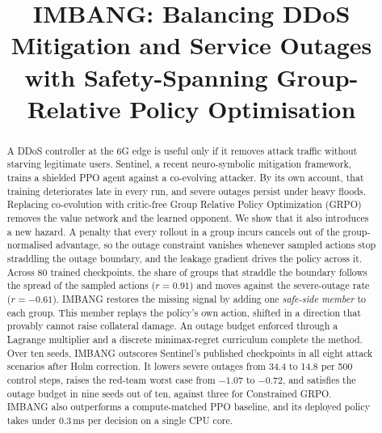 \documentclass[conference]{IEEEtran}
\begin{document}
\title{IMBANG: Balancing DDoS Mitigation and Service Outages with Safety-Spanning Group-Relative Policy Optimisation}

\author{
}

\maketitle

\begin{abstract}
A DDoS controller at the 6G edge is useful only if it removes attack traffic without starving legitimate users. Sentinel, a recent neuro-symbolic mitigation framework, trains a shielded PPO agent against a co-evolving attacker. By its own account, that training deteriorates late in every run, and severe outages persist under heavy floods. Replacing co-evolution with critic-free Group Relative Policy Optimization (GRPO) removes the value network and the learned opponent. We show that it also introduces a new hazard. A penalty that every rollout in a group incurs cancels out of the group-normalised advantage, so the outage constraint vanishes whenever sampled actions stop straddling the outage boundary, and the leakage gradient drives the policy across it. Across 80 trained checkpoints, the share of groups that straddle the boundary follows the spread of the sampled actions ($r=0.91$) and moves against the severe-outage rate ($r=-0.61$). IMBANG restores the missing signal by adding one \emph{safe-side member} to each group. This member replays the policy's own action, shifted in a direction that provably cannot raise collateral damage. An outage budget enforced through a Lagrange multiplier and a discrete minimax-regret curriculum complete the method. Over ten seeds, IMBANG outscores Sentinel's published checkpoints in all eight attack scenarios after Holm correction. It lowers severe outages from 34.4 to 14.8 per 500 control steps, raises the red-team worst case from $-1.07$ to $-0.72$, and satisfies the outage budget in nine seeds out of ten, against three for Constrained GRPO. IMBANG also outperforms a compute-matched PPO baseline, and its deployed policy takes under 0.3\,ms per decision on a single CPU core.
\end{abstract}
\end{document}

